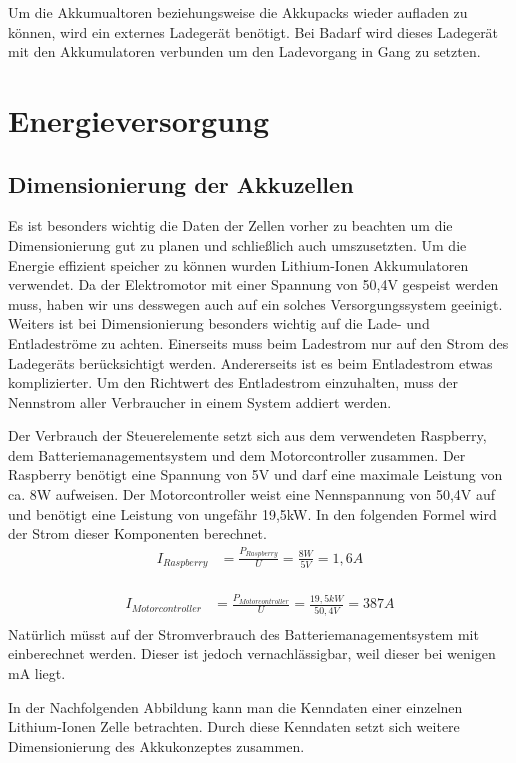 Um die Akkumualtoren beziehungsweise die Akkupacks wieder aufladen zu können, wird ein externes Ladegerät benötigt. Bei Badarf wird dieses Ladegerät mit den Akkumulatoren verbunden um den Ladevorgang in Gang zu setzten.
\newpage

\section{Energieversorgung}
\subsection{Dimensionierung der Akkuzellen}
Es ist besonders wichtig die Daten der Zellen vorher zu beachten um die Dimensionierung gut zu planen und schließlich auch umszusetzten. Um die Energie effizient speicher zu können wurden Lithium-Ionen Akkumulatoren verwendet. Da der Elektromotor mit einer Spannung von 50,4V gespeist werden muss, haben wir uns desswegen auch auf ein solches Versorgungssystem geeinigt. Weiters ist bei Dimensionierung besonders wichtig auf die Lade- und Entladeströme zu achten. Einerseits muss beim Ladestrom nur auf den Strom des Ladegeräts berücksichtigt werden. Andererseits ist es beim Entladestrom etwas komplizierter. Um den Richtwert des Entladestrom einzuhalten, muss der Nennstrom aller Verbraucher in einem System addiert werden.

Der Verbrauch der Steuerelemente setzt sich aus dem verwendeten Raspberry, dem Batteriemanagementsystem und dem Motorcontroller zusammen. Der Raspberry benötigt eine Spannung von 5V und darf eine maximale Leistung von ca. 8W aufweisen. Der Motorcontroller weist eine Nennspannung von 50,4V auf und benötigt eine Leistung von ungefähr 19,5kW. In den folgenden Formel wird der Strom dieser Komponenten berechnet.
\begin{align*}
I_{Raspberry} &= \frac{P_{Raspberry}}{U}=\frac{8 W}{5 V} = 1,6A\\
\end{align*}

\begin{align*}
I_{Motorcontroller} &= \frac{P_{Motorcontroller}}{U}=\frac{19,5 kW}{50,4 V} = 387 A\\
\end{align*}
Natürlich müsst auf der Stromverbrauch des Batteriemanagementsystem mit einberechnet werden. Dieser ist jedoch vernachlässigbar, weil dieser bei wenigen mA liegt.
\newpage

In der Nachfolgenden Abbildung kann man die Kenndaten einer einzelnen Lithium-Ionen Zelle betrachten. Durch diese Kenndaten setzt sich weitere Dimensionierung des Akkukonzeptes zusammen. 

